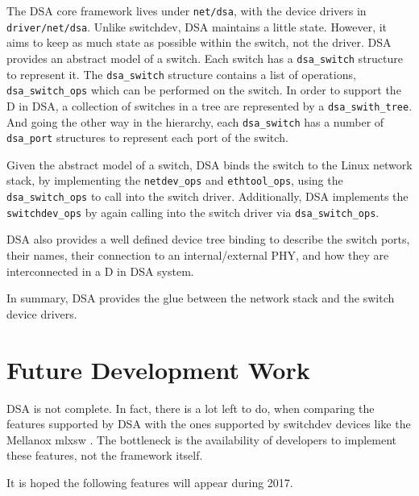 \documentclass[letterpaper]{article}
\begin{document}
The DSA core framework lives under \verb|net/dsa|, with the device
drivers in \verb|driver/net/dsa|. Unlike switchdev, DSA maintains a
little state. However, it aims to keep as much state as possible
within the switch, not the driver. DSA provides an abstract model of a
switch. Each switch has a \verb|dsa_switch| structure to represent
it. The \verb|dsa_switch| structure contains a list of operations,
\verb|dsa_switch_ops| which can be performed on the switch. In order
to support the D in DSA, a collection of switches in a tree are
represented by a \verb|dsa_swith_tree|. And going the other way in the
hierarchy, each \verb|dsa_switch| has a number of \verb|dsa_port|
structures to represent each port of the switch.

Given the abstract model of a switch, DSA binds the switch to the
Linux network stack, by implementing the \verb|netdev_ops| and
\verb|ethtool_ops|, using the \verb|dsa_switch_ops| to call into the
switch driver. Additionally, DSA implements the \verb|switchdev_ops|
by again calling into the switch driver via \verb|dsa_switch_ops|.

DSA also provides a well defined device tree binding to describe the
switch ports, their names, their connection to an internal/external
PHY, and how they are interconnected in a D in DSA system.

In summary, DSA provides the glue between the network stack and the
switch device drivers.

\section{Future Development Work}

DSA is not complete. In fact, there is a lot left to do, when
comparing the features supported by DSA with the ones supported by switchdev
devices like the
Mellanox mlxsw \cite{mlxsw}. The bottleneck is the availability of developers
to implement these features, not the framework itself.

It is hoped the following features will appear during 2017.
\end{document}

